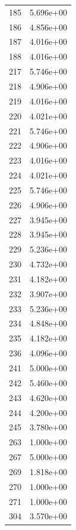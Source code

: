\documentclass[12pt]{article}
\begin{document}
\begin{longtable}{@{}cc@{}}
185 & 5.696e+00 \\
186 & 4.856e+00 \\
187 & 4.016e+00 \\
188 & 4.016e+00 \\
217 & 5.746e+00 \\
218 & 4.906e+00 \\
219 & 4.016e+00 \\
220 & 4.021e+00 \\
221 & 5.746e+00 \\
222 & 4.906e+00 \\
223 & 4.016e+00 \\
224 & 4.021e+00 \\
225 & 5.746e+00 \\
226 & 4.906e+00 \\
227 & 3.945e+00 \\
228 & 3.945e+00 \\
229 & 5.236e+00 \\
230 & 4.732e+00 \\
231 & 4.182e+00 \\
232 & 3.907e+00 \\
233 & 5.236e+00 \\
234 & 4.848e+00 \\
235 & 4.182e+00 \\
236 & 4.096e+00 \\
241 & 5.000e+00 \\
242 & 5.460e+00 \\
243 & 4.620e+00 \\
244 & 4.200e+00 \\
245 & 3.780e+00 \\
263 & 1.000e+00 \\
267 & 5.000e+00 \\
269 & 1.818e+00 \\
270 & 1.000e+00 \\
271 & 1.000e+00 \\
304 & 3.570e+00 \\

\bottomrule
\end{longtable}
\end{document}
